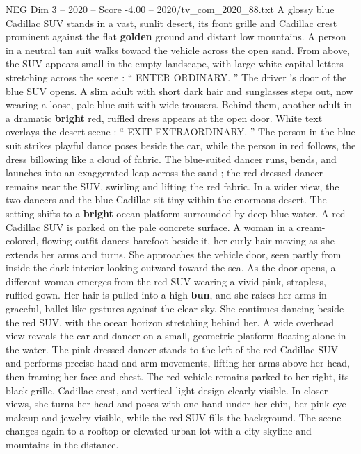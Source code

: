 \begin{textsample}{NEG Dim 3 – 2020 – Score -4.00 – 2020/tv\_com\_2020\_88.txt}  \label{ex:f3_neg_027}
A glossy blue Cadillac SUV stands in a vast, sunlit desert, its front grille and Cadillac crest prominent against the flat \textbf{golden} ground and distant low mountains.
A person in a neutral tan suit walks toward the vehicle across the open sand.
From above, the SUV appears small in the empty landscape, with large white capital letters stretching across the scene : “ ENTER ORDINARY. ” The driver ’s door of the blue SUV opens.
A slim adult with short dark hair and sunglasses steps out, now wearing a loose, pale blue suit with wide trousers.
Behind them, another adult in a dramatic \textbf{bright} red, ruffled dress appears at the open door.
White text overlays the desert scene : “ EXIT EXTRAORDINARY. ” The person in the blue suit strikes playful dance poses beside the car, while the person in red follows, the dress billowing like a cloud of fabric.
The blue-suited dancer runs, bends, and launches into an exaggerated leap across the sand ; the red-dressed dancer remains near the SUV, swirling and lifting the red fabric.
In a wider view, the two dancers and the blue Cadillac sit tiny within the enormous desert.
The setting shifts to a \textbf{bright} ocean platform surrounded by deep blue water.
A red Cadillac SUV is parked on the pale concrete surface.
A woman in a cream-colored, flowing outfit dances barefoot beside it, her curly hair moving as she extends her arms and turns.
She approaches the vehicle door, seen partly from inside the dark interior looking outward toward the sea.
As the door opens, a different woman emerges from the red SUV wearing a vivid pink, strapless, ruffled gown.
Her hair is pulled into a high \textbf{bun}, and she raises her arms in graceful, ballet-like gestures against the clear sky.
She continues dancing beside the red SUV, with the ocean horizon stretching behind her.
A wide overhead view reveals the car and dancer on a small, geometric platform floating alone in the water.
The pink-dressed dancer stands to the left of the red Cadillac SUV and performs precise hand and arm movements, lifting her arms above her head, then framing her face and chest.
The red vehicle remains parked to her right, its black grille, Cadillac crest, and vertical light design clearly visible.
In closer views, she turns her head and poses with one hand under her chin, her pink eye makeup and jewelry visible, while the red SUV fills the background.
The scene changes again to a rooftop or elevated urban lot with a city skyline and mountains in the distance.

\end{textsample}
